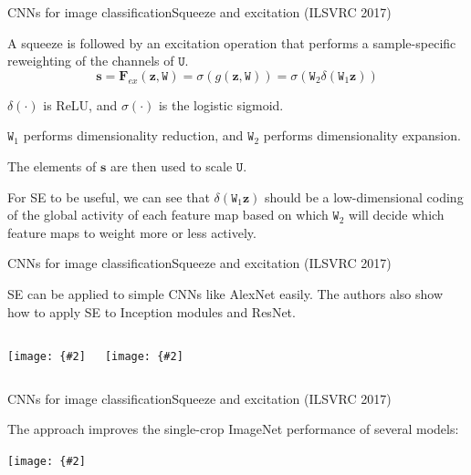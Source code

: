\documentclass{beamer}
\renewcommand{\vec}[1]{\boldsymbol{#1}}
\newcommand{\mat}[1]{\mathtt{#1}}
\newcommand{\myfig}[3]{\centerline{\texttt{[image: \{\#2]}}}
\begin{document}
\begin{frame}{CNNs for image classification}{Squeeze and excitation (ILSVRC 2017)}

  A squeeze is followed by an \alert{excitation} operation that performs a
  sample-specific reweighting of the channels of $\mat{U}$.
  \[ \vec{s} = \vec{F}_{ex}(\vec{z},\mat{W}) = \sigma(g(\vec{z},\mat{W}))
  = \sigma(\mat{W}_2\delta(\mat{W}_1\vec{z})) \]

  $\delta(\cdot)$ is ReLU, and $\sigma(\cdot)$ is the logistic sigmoid.

  \medskip
  
  $\mat{W}_1$ performs dimensionality reduction, and $\mat{W}_2$
  performs dimensionality expansion.

  \medskip

  The elements of $\vec{s}$ are then used to scale $\mat{U}$.

  \medskip
  
  For SE to be useful, we can see that $\delta(\mat{W}_1\vec{z})$
  should be a low-dimensional coding of the global activity of each
  feature map based on which $\mat{W}_2$ will decide which feature
  maps to weight more or less actively.

\end{frame}


\begin{frame}{CNNs for image classification}{Squeeze and excitation (ILSVRC 2017)}

  SE can be applied to simple CNNs like AlexNet easily. The authors
  also show how to apply SE to Inception modules and ResNet.

  \medskip

  \begin{columns}
    \column{2.2in}
    \myfig{2in}{hu-fig2}{Hu, Shen, and Sun (2018), Fig.\ 2}
    \column{2.2in}
    \myfig{2in}{hu-fig3}{Hu, Shen, and Sun (2018), Fig.\ 3}
  \end{columns}

\end{frame}


\begin{frame}{CNNs for image classification}{Squeeze and excitation (ILSVRC 2017)}

  The approach improves the single-crop ImageNet
  performance of several models:

  \medskip
  
  \myfig{4.5in}{hu-table2}{Hu, Shen, and Sun (2018), Table 2}
  
\end{frame}
\end{document}

